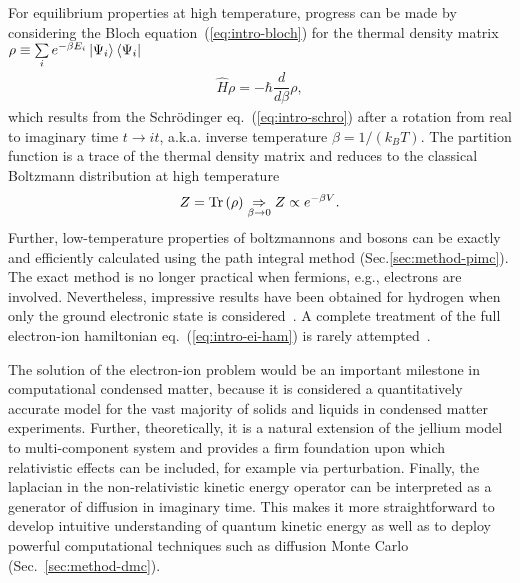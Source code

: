 For equilibrium properties at high temperature, progress can be made by considering the Bloch equation~(\ref{eq:intro-bloch}) for the thermal density matrix $\rho\equiv\sum\limits_i e^{-\beta E_i} \ket{\Psi_i}\bra{\Psi_i}$
\begin{align} \label{eq:intro-bloch}
\hat{H} \rho = -\hbar\dfrac{d}{d\beta}\rho,
\end{align}
which results from the Schr\"odinger eq.~(\ref{eq:intro-schro}) after a rotation from real to imaginary time $t\rightarrow it$, a.k.a. inverse temperature $\beta=1/(k_BT)$.
The partition function is a trace of the thermal density matrix and reduces to the classical Boltzmann distribution at high temperature
\begin{align}
Z=\text{Tr}\left(\rho\right) \underset{\beta\rightarrow 0}{\Rightarrow} Z \propto e^{-\beta V}.
\end{align}
Further, low-temperature properties of boltzmannons and bosons can be exactly and efficiently calculated using the path integral method (Sec.\ref{sec:method-pimc}). The exact method is no longer practical when fermions, e.g., electrons are involved. Nevertheless, impressive results have been obtained for hydrogen when only the ground electronic state is considered~\cite{Pierleoni2016b,Celliers2018}.
A complete treatment of the full electron-ion hamiltonian eq.~(\ref{eq:intro-ei-ham}) is rarely attempted~\cite{Ceperley1981,Natoli1995}.

The solution of the electron-ion problem would be an important milestone in computational condensed matter, because it is considered a quantitatively accurate model for the vast majority of solids and liquids in condensed matter experiments. Further, theoretically, it is a natural extension of the jellium model to multi-component system and provides a firm foundation upon which relativistic effects can be included, for example via perturbation. Finally, the laplacian in the non-relativistic kinetic energy operator can be interpreted as a generator of diffusion in imaginary time. This makes it more straightforward to develop intuitive understanding of quantum kinetic energy as well as to deploy powerful computational techniques such as diffusion Monte Carlo (Sec.~\ref{sec:method-dmc}).

